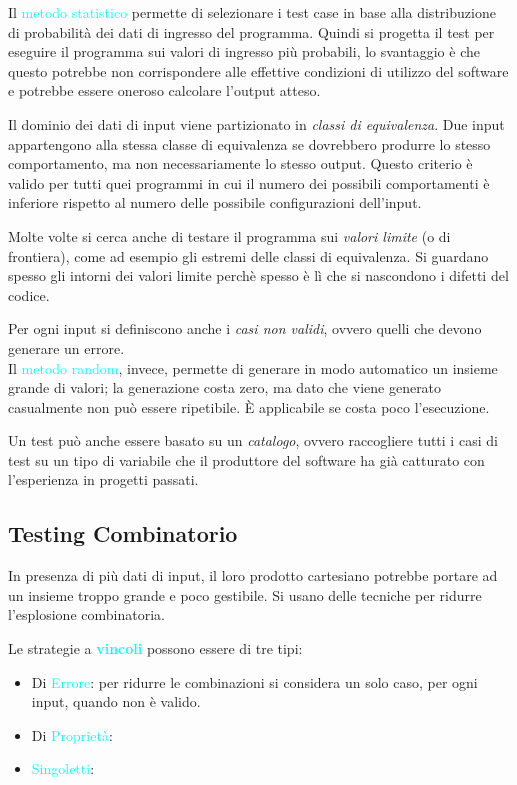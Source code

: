 Il \textcolor{cyan}{metodo statistico} permette di selezionare i test case in base
alla distribuzione di probabilità dei dati di ingresso del programma. Quindi
si progetta il test per eseguire il programma sui valori di ingresso più probabili, lo svantaggio
è che questo potrebbe non corrispondere alle effettive condizioni di utilizzo del software e potrebbe
essere oneroso calcolare l'output atteso.

Il dominio dei dati di input viene partizionato in \emph{classi di equivalenza}. Due input
appartengono alla stessa classe di equivalenza se dovrebbero produrre lo stesso comportamento,
ma non necessariamente lo stesso output. Questo criterio è valido per tutti quei
programmi in cui il numero dei possibili comportamenti è inferiore rispetto al numero
delle possibile configurazioni dell'input.

Molte volte si cerca anche di testare il programma sui \emph{valori limite} (o di frontiera),
come ad esempio gli estremi delle classi di equivalenza. Si guardano spesso gli intorni
dei valori limite perchè spesso è lì che si nascondono i difetti del codice.

Per ogni input si definiscono anche i \emph{casi non validi}, ovvero quelli che devono
generare un errore. \\

Il \textcolor{cyan}{metodo random}, invece, permette di generare in modo automatico un insieme
grande di valori; la generazione costa zero, ma dato che viene generato casualmente non può
essere ripetibile. È applicabile se costa poco l'esecuzione.

Un test può anche essere basato su un \emph{catalogo}, ovvero raccogliere tutti
i casi di test su un tipo di variabile che il produttore del software ha già catturato con l'esperienza in
progetti passati.

\subsection{Testing Combinatorio}

In presenza di più dati di input, il loro prodotto cartesiano potrebbe portare
ad un insieme troppo grande e poco gestibile. Si usano delle tecniche per ridurre
l'esplosione combinatoria.

Le strategie a \textbf{\textcolor{cyan}{vincoli}} possono essere di tre tipi:
\begin{itemize}
    \item Di \textcolor{cyan}{Errore}: per ridurre le combinazioni si considera
        un solo caso, per ogni input, quando non è valido.
    \item Di \textcolor{cyan}{Proprietà}: 
    \item \textcolor{cyan}{Singoletti}: 
\end{itemize}